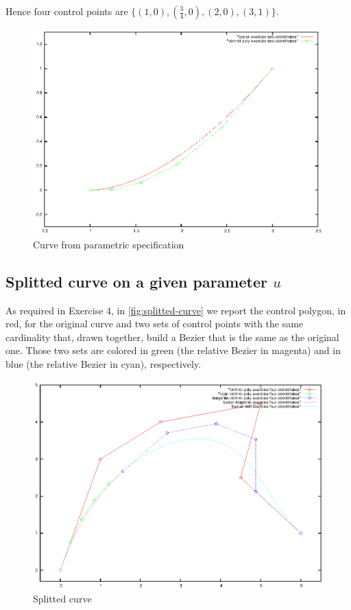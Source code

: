 \documentclass{article}
\begin{document}
Hence four control points are $\{(1,0), (\frac{3}{4},0), (2,0),
(3,1)\}$.
\begin{figure}
  \centering
  \includegraphics{bezier-deCasteljau-curves/exercise-two}
  \caption{Curve from parametric specification}
  \label{fig:curve-from-parametric-spec}
\end{figure}

\subsection{Splitted curve on a given parameter $u$}
As required in Exercise 4, in \autoref{fig:splitted-curve} we report
the control polygon, in red, for the original curve and two sets of
control points with the same cardinality that, drawn together, build a
Bezier that is the same as the original one. Those two sets are
colored in green (the relative Bezier in magenta) and in blue (the
relative Bezier in cyan), respectively.
\begin{figure}
  \centering
  \includegraphics{bezier-deCasteljau-curves/exercise-four}
  \caption{Splitted curve}
  \label{fig:splitted-curve}
\end{figure}
\end{document}
